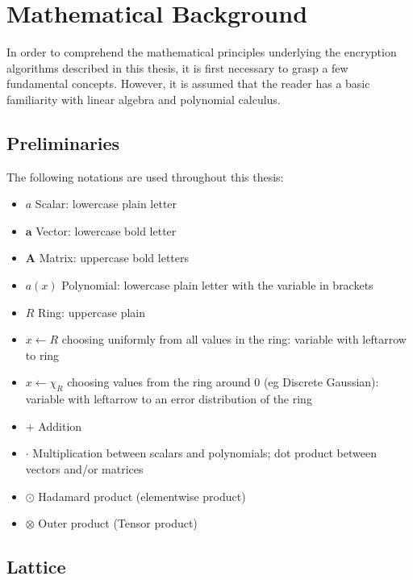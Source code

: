 \chapter{Mathematical Background}
\label{MathBack}

In order to comprehend the mathematical principles underlying the encryption algorithms described in this thesis, it is first necessary to grasp a few fundamental concepts. However, it is assumed that the reader has a basic familiarity with linear algebra and polynomial calculus.

\section{Preliminaries}

The following notations are used throughout this thesis:

\begin{itemize}[label=$ $]
  \item $a$ \Leftarrow  Scalar: lowercase plain letter
  \item $\textbf{a}$ \Leftarrow Vector: lowercase bold letter
  \item $\textbf{A}$ \Leftarrow Matrix: uppercase bold letters
  \item $a(x)$ \Leftarrow Polynomial: lowercase plain letter with the variable in brackets
  \item $R$ \Leftarrow Ring: uppercase plain
  \item $x \leftarrow R$ \Leftarrow choosing uniformly from all values in the ring: variable with leftarrow to ring
  \item $x \leftarrow \chi_R$ \Leftarrow choosing values from the ring around 0 (eg Discrete Gaussian): variable with leftarrow to an error distribution of the ring
  \item $+$ \Leftarrow Addition
  \item $\cdot$ \Leftarrow  Multiplication between scalars and polynomials; dot product between vectors and/or matrices
  \item $\odot$ \Leftarrow Hadamard product (elementwise product)
  \item $\otimes$ \Leftarrow Outer product (Tensor product)
\end{itemize}

\section{Lattice}


